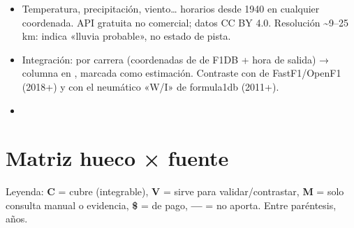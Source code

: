\begin{itemize}
\item Temperatura, precipitación, viento… horarios desde 1940 en cualquier coordenada. API gratuita no comercial; datos CC BY 4.0. Resolución \textasciitilde{}9–25 km: indica «lluvia probable», no estado de pista.
\item Integración:  por carrera (coordenadas de  de F1DB + hora de salida) → columna  en , marcada como estimación. Contraste con  de FastF1/OpenF1 (2018+) y con el neumático «W/I» de formula1db (2011+).
\item \href{https://open-meteo.com/en/docs/historical-weather-api}{}
\end{itemize}

\section{Matriz hueco × fuente}

Leyenda: \textbf{C} = cubre (integrable), \textbf{V} = sirve para validar/contrastar, \textbf{M} = solo consulta manual o evidencia, \textbf{\$} = de pago, \textbf{—} = no aporta. Entre paréntesis, años.

